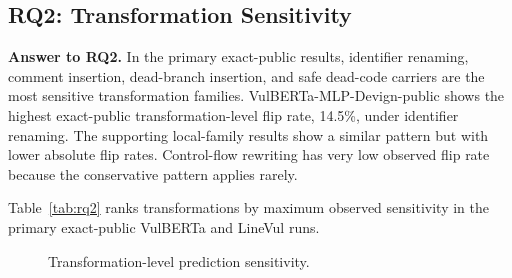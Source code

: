 \documentclass[a4paper,fleqn]{cas-dc}
\begin{document}
\subsection{RQ2: Transformation Sensitivity}

\textbf{Answer to RQ2.} In the primary exact-public results, identifier
renaming, comment insertion, dead-branch insertion, and safe dead-code carriers
are the most sensitive transformation families. VulBERTa-MLP-Devign-public
shows the highest exact-public transformation-level flip rate, 14.5\%, under
identifier renaming. The supporting local-family results show a similar pattern
but with lower absolute flip rates. Control-flow rewriting has very low
observed flip rate because the conservative pattern applies rarely.

Table~\ref{tab:rq2} ranks transformations by maximum observed sensitivity in
the primary exact-public VulBERTa and LineVul runs.

\begin{table}[t]
  \centering
  \caption{Transformation sensitivity.}
  \label{tab:rq2}
\end{table}

\begin{figure}
  \centering
  \resizebox{\columnwidth}{!}{}
  \caption{Transformation-level prediction sensitivity.}
  \label{fig:transformation-sensitivity}
\end{figure}
\end{document}
